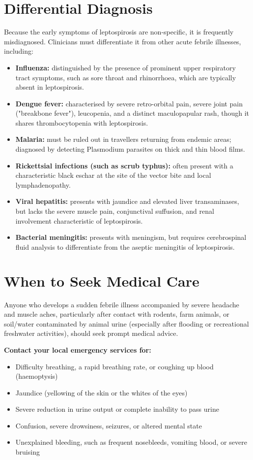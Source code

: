 \section*{Differential Diagnosis}
Because the early symptoms of leptospirosis are non-specific, it is frequently misdiagnosed. Clinicians must differentiate it from other acute febrile illnesses, including:
\begin{itemize}
    \item \textbf{Influenza:} distinguished by the presence of prominent upper respiratory tract symptoms, such as sore throat and rhinorrhoea, which are typically absent in leptospirosis.
    \item \textbf{Dengue fever:} characterised by severe retro-orbital pain, severe joint pain ("breakbone fever"), leucopenia, and a distinct maculopapular rash, though it shares thrombocytopenia with leptospirosis.
    \item \textbf{Malaria:} must be ruled out in travellers returning from endemic areas; diagnosed by detecting Plasmodium parasites on thick and thin blood films.
    \item \textbf{Rickettsial infections (such as scrub typhus):} often present with a characteristic black eschar at the site of the vector bite and local lymphadenopathy.
    \item \textbf{Viral hepatitis:} presents with jaundice and elevated liver transaminases, but lacks the severe muscle pain, conjunctival suffusion, and renal involvement characteristic of leptospirosis.
    \item \textbf{Bacterial meningitis:} presents with meningism, but requires cerebrospinal fluid analysis to differentiate from the aseptic meningitis of leptospirosis.
\end{itemize}

\section*{When to Seek Medical Care}
Anyone who develops a sudden febrile illness accompanied by severe headache and muscle aches, particularly after contact with rodents, farm animals, or soil/water contaminated by animal urine (especially after flooding or recreational freshwater activities), should seek prompt medical advice.

\textbf{Contact your local emergency services for:}
\begin{itemize}
    \item Difficulty breathing, a rapid breathing rate, or coughing up blood (haemoptysis)
    \item Jaundice (yellowing of the skin or the whites of the eyes)
    \item Severe reduction in urine output or complete inability to pass urine
    \item Confusion, severe drowsiness, seizures, or altered mental state
    \item Unexplained bleeding, such as frequent nosebleeds, vomiting blood, or severe bruising
\end{itemize}

